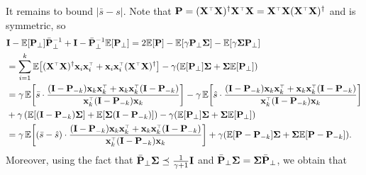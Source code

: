 \documentclass{article}
\begin{document}
It remains to bound $|\bar s - s|$. Note that $\P=(\X^\top\X)^\dagger\X^\top\X = \X^\top\X
(\X^\top\X)^\dagger$ and is symmetric, so
\begin{align*}
  &\I - \E[\P_\perp]\bar\P_\perp^{-1} + \I - \bar\P_\perp^{-1} \E[\P_\perp]
  = 2\E[\P] - \E[\gamma\P_\perp\Sigmab] - \E[\gamma\Sigmab\P_\perp]\\
  &= \sum_{i=1}^k\E\big[(\X^\top\X)^\dagger\x_i\x_i^\top + \x_i\x_i^\top (\X^\top\X)^\dagger \big] - \gamma (\E[\P_\perp]\Sigmab + \Sigmab \E[\P_\perp])\\
  &=\gamma\,
    \E\bigg[\bar s\cdot\frac{(\I-\P_{-k})\x_k\x_k^\top + \x_k\x_k^\top (\I-\P_{-k})} {\x_k^\top(\I - \P_{-k}) \x_k}\bigg]
    -\gamma\,\E\bigg[\hat s
    \cdot\frac{(\I-\P_{-k})\x_k\x_k^\top + \x_k\x_k^\top (\I-\P_{-k})}{\x_k^\top(\I-\P_{-k})\x_k}\bigg] \\ 
  & +\gamma\,(\E[(\I - \P_{-k})\Sigmab] + \E[\Sigmab ( \I -\P_{-k}) ])- \gamma (\E[\P_\perp]\Sigmab + \Sigmab \E[\P_\perp]) \\
  &=\gamma\,\E\bigg[(\bar s - \hat s)
    \cdot\frac{(\I-\P_{-k})\x_k\x_k^\top + \x_k\x_k^\top (\I-\P_{-k})}{\x_k^\top(\I-\P_{-k})\x_k}\bigg]
+    \gamma (\E[\P-\P_{-k}]\Sigmab + \Sigmab \E[\P-\P_{-k}]). 
\end{align*}
Moreover, using the fact that $\bar{\mathbf P}_\perp\mathbf{\Sigma}\preceq\frac1{\gamma+1}\mathbf I$ and $\bar {\mathbf P}_\perp \mathbf{\Sigma} = \mathbf{\Sigma} \bar {\mathbf P}_\perp$, we obtain that
\end{document}
